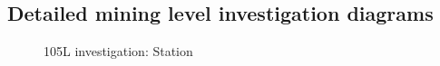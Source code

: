 \begin{appendices}
\chapter{\hspace{0.3cm}Detailed mining level investigation diagrams}\label{Manualinvestigation}
\clearpage
\begin{figure}[h!]
	\centering
	\caption{105L investigation: Station}
	\label{fig: KUS Underground level layout}
\end{figure}
\begin{figure}[h!]
	\centering

\end{figure}
\end{appendices}
